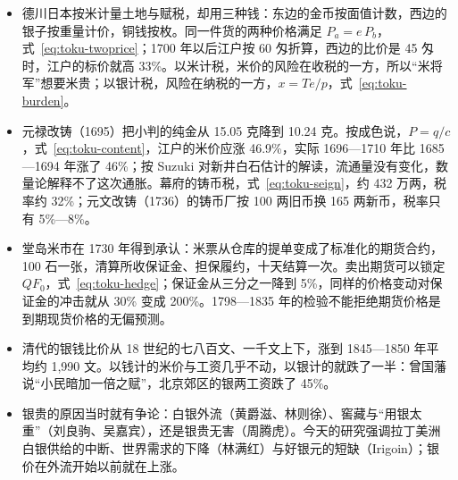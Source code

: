 \begin{takeaways}
\begin{itemize}
\item 德川日本按米计量土地与赋税，却用三种钱：东边的金币按面值计数，西边的银子按重量计价，铜钱按枚。同一件货的两种价格满足 $P_a=e\,P_b$，式~\eqref{eq:toku-twoprice}；1700 年以后江户按 60 匁折算，西边的比价是 45 匁时，江户的标价就高 33\%。以米计税，米价的风险在收税的一方，所以“米将军”想要米贵；以银计税，风险在纳税的一方，$x=Te/p$，式~\eqref{eq:toku-burden}。
\item 元禄改铸（1695）把小判的纯金从 15.05 克降到 10.24 克。按成色说，$P=q/c$，式~\eqref{eq:toku-content}，江户的米价应涨 46.9\%，实际 1696—1710 年比 1685—1694 年涨了 46\%；按 Suzuki 对新井白石估计的解读，流通量没有变化，数量论解释不了这次通胀。幕府的铸币税，式~\eqref{eq:toku-seign}，约 432 万两，税率约 32\%；元文改铸（1736）的铸币厂按 100 两旧币换 165 两新币，税率只有 5\%—8\%。
\item 堂岛米市在 1730 年得到承认：米票从仓库的提单变成了标准化的期货合约，100 石一张，清算所收保证金、担保履约，十天结算一次。卖出期货可以锁定 $QF_0$，式~\eqref{eq:toku-hedge}；保证金从三分之一降到 5\%，同样的价格变动对保证金的冲击就从 30\% 变成 200\%。1798—1835 年的检验不能拒绝期货价格是到期现货价格的无偏预测。
\item 清代的银钱比价从 18 世纪的七八百文、一千文上下，涨到 1845—1850 年平均约 1,990 文。以钱计的米价与工资几乎不动，以银计的就跌了一半：曾国藩说“小民暗加一倍之赋”，北京郊区的银两工资跌了 45\%。
\item 银贵的原因当时就有争论：白银外流（黄爵滋、林则徐）、窖藏与“用银太重”（刘良驹、吴嘉宾），还是银贵无害（周腾虎）。今天的研究强调拉丁美洲白银供给的中断、世界需求的下降（林满红）与好银元的短缺（Irigoin）；银价在外流开始以前就在上涨。
\end{itemize}
\end{takeaways}

